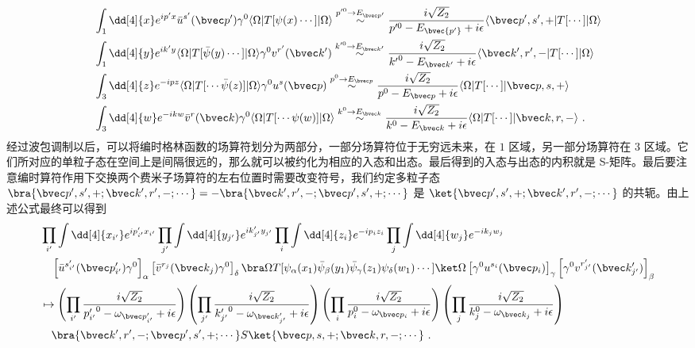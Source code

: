 \begin{equation}
\begin{aligned}
&\int_{ 1} \dd[4]{x} e^{ip'x} \bar{u}^{s'}(\bvec p')\gamma^0\langle \Omega|T[\psi(x)\cdots]|\Omega\rangle
\stackrel{p'^0\rightarrow E_{\bvec p'}}{\sim}
\frac{i\sqrt{Z_2}}{p'^0-E_{\bvec {p'}}+i\epsilon} \langle \bvec p',s',+| T[\cdots]|\Omega\rangle\\
&
\int_{ 1} \dd[4]{y} e^{ik'y} \langle \Omega|T[\bar{\psi}(y)\cdots]|\Omega\rangle \gamma^0 v^{r'}(\bvec k')
\stackrel{k'^0\rightarrow E_{\bvec k'}}{\sim}
\frac{i\sqrt{Z_2}}{{k'}^0-E_{\bvec k'}+i\epsilon} \langle \bvec k',r',-| T[\cdots]|\Omega\rangle\\
&
\int_{ 3} \dd[4]{z} e^{-ipz}
\langle \Omega|T[\cdots\bar{\psi}(z)]| \Omega\rangle\gamma^0  u^{s}(\bvec p)
\stackrel{p^0\rightarrow E_{\bvec p}}{\sim}
\frac{i\sqrt{Z_2}}{p^0-E_{\bvec p}+i\epsilon} \langle \Omega| T[\cdots]|\bvec p,s,+\rangle\\
&
\int_{ 3} \dd[4]{w} e^{-ikw}
\bar{v}^{r}(\bvec k)\gamma^0\langle \Omega|T[\cdots\psi(w)]| \Omega\rangle  
\stackrel{k^0\rightarrow E_{\bvec k}}{\sim}
\frac{i\sqrt{Z_2}}{k^0-E_{\bvec k}+i\epsilon} \langle \Omega| T[\cdots]|\bvec k,r,-\rangle~.
\end{aligned}
\end{equation}
经过波包调制以后，可以将编时格林函数的场算符划分为两部分，一部分场算符位于无穷远未来，在 $ 1$ 区域，另一部分场算符在 $ 3$ 区域。它们所对应的单粒子态在空间上是间隔很远的，那么就可以被约化为相应的入态和出态。最后得到的入态与出态的内积就是 S-矩阵。最后要注意编时算符作用下交换两个费米子场算符的左右位置时需要改变符号，我们约定多粒子态 $\bra{\bvec p',s',+;\bvec k',r',-;\cdots}=-\bra{\bvec k',r',-;\bvec p',s',+;\cdots}$ 是 $\ket{\bvec p',s',+;\bvec k',r',-;\cdots}$ 的共轭。由上述公式最终可以得到
\begin{equation}
\begin{aligned}
&
\prod_{i'}\int \dd[4]{x_{i'}} e^{ip'_{i'}x_{i'}}
\prod_{j'}\int \dd[4]{y_{j'}} e^{ik'_{j'}y_{j'}}
\prod_{i}\int \dd[4]{z_{i}} e^{-ip_{i}z_{i}}
\prod_{j}\int \dd[4]{w_{j}} e^{-ik_{j}w_{j}}
\\
&
\quad \left[\bar u^{s'_{i'}}(\bvec p'_{i'})\gamma^0\right]_{\alpha} 
\left[{\bar v}^{r_j}(\bvec k_{j})\gamma^0\right]_{\delta}
\bra\Omega T[\psi_\alpha(x_1)\bar\psi_\beta(y_1)\bar\psi_\gamma(z_1)\psi_\delta(w_1)\cdots]\ket \Omega 
\left[\gamma^0 u^{s_i}(\bvec p_{i})\right]_{\gamma} \left[\gamma^0 v^{r'_{j'}}(\bvec k'_{j'})\right]_{\beta}
\\
&
\mapsto 
\left(\prod_{i'}\frac{i\sqrt{Z_2}} {{p'_{i'}}^0-\omega_{\bvec p'_{i'}}+i\epsilon}\right)
\left(\prod_{j'}\frac{i\sqrt{Z_2}}{{k'_{j'}}^0-\omega_{\bvec k'_{j'}}+i\epsilon}\right)
\left(\prod_{i}\frac{i\sqrt{Z_2}}{p_i^0-\omega_{\bvec p_i}+i\epsilon}\right)
\left(\prod_{j}\frac{i\sqrt{Z_2}}{k_j^0-\omega_{\bvec k_j}+i\epsilon}\right)
\\
&
\quad \bra{\bvec k',r',-;\bvec p',s',+;\cdots} S \ket{\bvec p,s,+;\bvec k,r,-;\cdots}~.
\end{aligned}
\end{equation}
